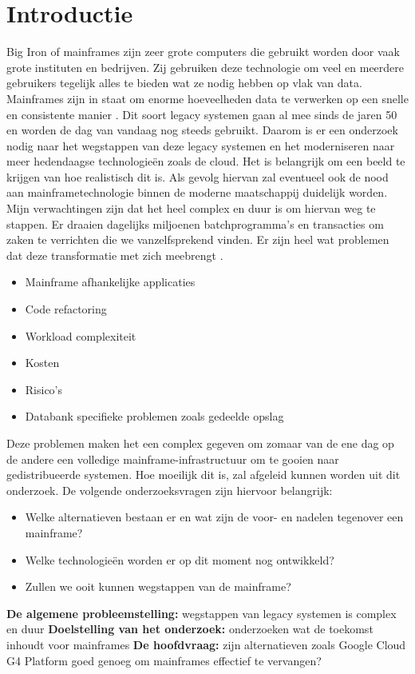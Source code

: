 
\section{Introductie} %
\label{sec:introductie}
Big Iron of mainframes zijn zeer grote computers die gebruikt worden door vaak grote instituten en bedrijven. Zij gebruiken deze technologie om veel en meerdere gebruikers tegelijk alles te bieden wat ze nodig hebben op vlak van data. Mainframes zijn in staat om enorme hoeveelheden data te verwerken op een snelle en consistente manier \autocite{Ebbers2016}. Dit soort legacy systemen gaan al mee sinds de jaren 50 en worden de dag van vandaag nog steeds gebruikt. Daarom is er een onderzoek nodig naar het wegstappen van deze legacy systemen en het moderniseren naar meer hedendaagse technologieën zoals de cloud. Het is belangrijk om een beeld te krijgen van hoe realistisch dit is. Als gevolg hiervan zal eventueel ook de nood aan mainframetechnologie binnen de moderne maatschappij duidelijk worden. Mijn verwachtingen zijn dat het heel complex en duur is om hiervan weg te stappen. Er draaien dagelijks miljoenen batchprogramma’s en transacties om zaken te verrichten die we vanzelfsprekend vinden. Er zijn heel wat problemen dat deze transformatie met zich meebrengt  \autocite{Long2018}.
\begin{itemize}
    \item Mainframe afhankelijke applicaties
    \item Code refactoring
    \item Workload complexiteit
    \item Kosten
    \item Risico's
    \item Databank specifieke problemen zoals gedeelde opslag
\end{itemize}
Deze problemen maken het een complex gegeven om zomaar van de ene dag op de andere een volledige mainframe-infrastructuur om te gooien naar gedistribueerde systemen. Hoe moeilijk dit is, zal afgeleid kunnen worden uit dit onderzoek. De volgende onderzoeksvragen zijn hiervoor belangrijk:
\begin{itemize}
    \item Welke alternatieven bestaan er en wat zijn de voor- en nadelen tegenover een mainframe?
    \item Welke technologieën worden er op dit moment nog ontwikkeld?
    \item Zullen we ooit kunnen wegstappen van de mainframe?
\end{itemize}
\textbf{De algemene probleemstelling:} wegstappen van legacy systemen is complex en duur \newline
\textbf{Doelstelling van het onderzoek:} onderzoeken wat de toekomst inhoudt voor mainframes \newline
\textbf{De hoofdvraag:} zijn alternatieven zoals Google Cloud G4 Platform goed genoeg om mainframes effectief te vervangen?

